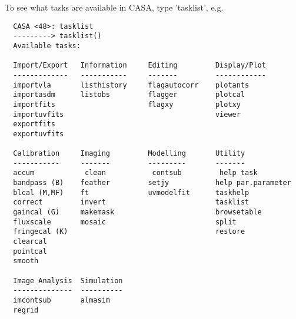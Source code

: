 To see what tasks are available in CASA, type 'tasklist', e.g. 
\small
\begin{verbatim}
  CASA <48>: tasklist
  ---------> tasklist()
  Available tasks: 

  Import/Export   Information     Editing         Display/Plot
  -------------   -----------     -------         ------------
  importvla       listhistory     flagautocorr    plotants
  importasdm      listobs         flagger         plotcal 
  importfits                      flagxy          plotxy
  importuvfits                                    viewer
  exportfits
  exportuvfits

  Calibration     Imaging         Modelling       Utility
  -----------     -------         ---------       -------
  accum            clean           contsub         help task
  bandpass (B)    feather         setjy           help par.parameter
  blcal (M,MF)    ft              uvmodelfit      taskhelp
  correct         invert                          tasklist
  gaincal (G)     makemask                        browsetable
  fluxscale       mosaic                          split
  fringecal (K)                                   restore
  clearcal                                                
  pointcal 
  smooth

  Image Analysis  Simulation
  --------------  ----------
  imcontsub       almasim
  regrid
\end{verbatim}
\normalsize

